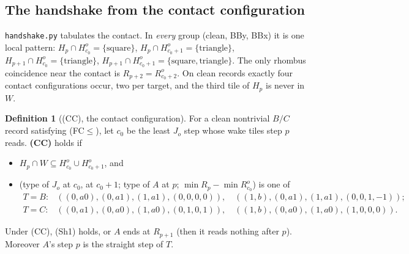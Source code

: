 \documentclass[11pt]{article}
\theoremstyle{definition}\newtheorem{definition}[theorem]{Definition}\newtheorem{remark}[theorem]{Remark}
\begin{document}
\subsection{The handshake from the contact configuration}\label{sec:contactcc}
\texttt{handshake.py} tabulates the contact. In \emph{every} group (clean, BBy, BBx) it is one local pattern: $H_p\cap H^o_{c_0}=\{\text{square}\}$, $H_p\cap H^o_{c_0+1}=\{\text{triangle}\}$, $H_{p+1}\cap H^o_{c_0}=\{\text{triangle}\}$, $H_{p+1}\cap H^o_{c_0+1}=\{\text{square},\text{triangle}\}$. The only rhombus coincidence near the contact is $R_{p+2}=R^o_{c_0+2}$.
On clean records exactly four contact configurations occur, two per target, and the third tile of $H_p$ is never in $W$.
\begin{definition}[(CC), the contact configuration]
For a clean nontrivial $B/C$ record satisfying (FC$\le$), let $c_0$ be the least $J_o$ step whose wake tiles step $p$ reads. \textbf{(CC)} holds if
\begin{itemize}
\item[(CC1)] $H_p\cap W\subseteq H^o_{c_0}\cup H^o_{c_0+1}$, and
\item[(CC2)] (type of $J_o$ at $c_0$, at $c_0+1$; type of $A$ at $p$; $\min R_p-\min R^o_{c_0}$) is one of
\[\begin{array}{ll}
T=B: & ((0,a0),(0,a1),(1,a1),(0,0,0,0)),\quad((1,b),(0,a1),(1,a1),(0,0,1,-1));\\
T=C: & ((0,a1),(0,a0),(1,a0),(0,1,0,1)),\quad((1,b),(0,a0),(1,a0),(1,0,0,0)).
\end{array}\]
\end{itemize}
\end{definition}
\begin{proposition}\label{prop:hs}
Under (CC), (Sh1) holds, or $A$ ends at $R_{p+1}$ (then it reads nothing after $p$). Moreover $A$'s step $p$ is the straight step of $T$.
\end{proposition}
\end{document}
